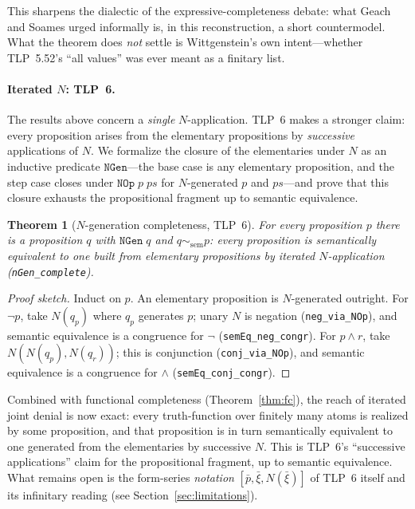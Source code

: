 \documentclass[jsl,bibother]{asl}
\newtheorem{theorem}{Theorem}[section]
\theoremstyle{definition}
\theoremstyle{remark}
\newcommand{\semEq}{\sim_{\mathrm{sem}}}
\begin{document}
\noindent
This sharpens the dialectic of the expressive-completeness
debate: what Geach and Soames urged informally is, in this
reconstruction, a short countermodel.  What the theorem does
\emph{not} settle is Wittgenstein's own intent---whether
TLP~5.52's ``all values'' was ever meant as a finitary list.

\paragraph{Iterated $N$: TLP~6.}
The results above concern a \emph{single} $N$-application.
TLP~6 makes a stronger claim: every proposition arises from
the elementary propositions by \emph{successive} applications
of $N$.  We formalize the closure of the elementaries under
$N$ as an inductive predicate $\mathtt{NGen}$---the base case
is any elementary proposition, and the step case closes under
$\mathtt{NOp}\;p\;ps$ for $N$-generated $p$ and $ps$---and
prove that this closure exhausts the propositional fragment
up to semantic equivalence.

\begin{theorem}[$N$-generation completeness, TLP~6]
\label{thm:ngen}
For every proposition $p$ there is a proposition $q$ with
$\mathtt{NGen}\;q$ and $q \semEq p$: every proposition is
semantically equivalent to one built from elementary
propositions by iterated $N$-application
(\texttt{nGen\_complete}).
\end{theorem}

\begin{proof}[Proof sketch]
Induct on $p$.  An elementary proposition is $N$-generated
outright.  For $\lnot p$, take $N(q_p)$ where $q_p$ generates
$p$; unary $N$ is negation (\texttt{neg\_via\_NOp}), and
semantic equivalence is a congruence for $\lnot$
(\texttt{semEq\_neg\_congr}).  For $p \land r$, take
$N(N(q_p), N(q_r))$; this is conjunction
(\texttt{conj\_via\_NOp}), and semantic equivalence is a
congruence for $\land$ (\texttt{semEq\_conj\_congr}).
\end{proof}

\noindent
Combined with functional completeness
(Theorem~\ref{thm:fc}), the reach of iterated
joint denial is now exact: every truth-function over finitely
many atoms is realized by some proposition, and that
proposition is in turn semantically equivalent to one
generated from the elementaries by successive $N$.  This is
TLP~6's ``successive applications'' claim for the
propositional fragment, up to semantic equivalence.  What
remains open is the form-series \emph{notation}
$[\bar{p}, \bar{\xi}, N(\bar{\xi})]$ of TLP~6 itself and its
infinitary reading (see Section~\ref{sec:limitations}).
\end{document}
